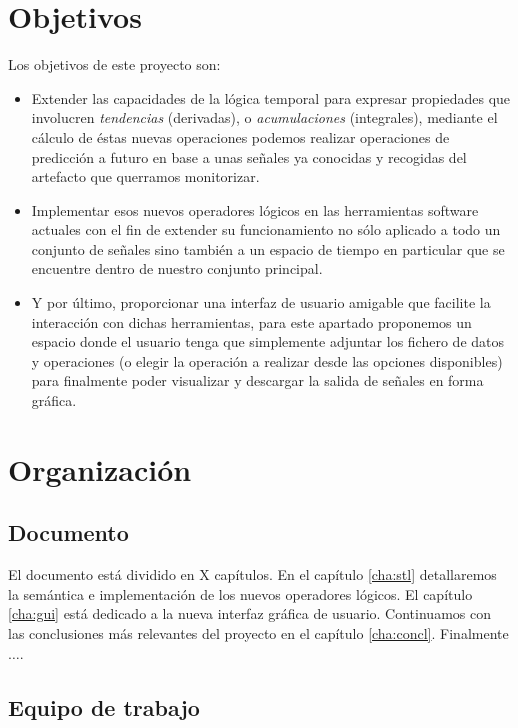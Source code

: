 \section{Objetivos}

Los objetivos de este proyecto son:

\begin{itemize}
\item Extender las capacidades de la lógica temporal para expresar propiedades que involucren \textit{tendencias} (derivadas), o \textit{acumulaciones} (integrales), mediante el cálculo de éstas nuevas operaciones podemos realizar operaciones de predicción a futuro en base a unas señales ya conocidas y recogidas del artefacto que querramos monitorizar.   
\item Implementar esos nuevos operadores lógicos en las herramientas software actuales con el fin de extender su funcionamiento no sólo aplicado a todo un conjunto de señales sino también a un espacio de tiempo en particular que se encuentre dentro de nuestro conjunto principal. 
\item Y por último, proporcionar una interfaz de usuario amigable que facilite la interacción con dichas herramientas, para este apartado  proponemos un espacio donde el usuario tenga que simplemente adjuntar los fichero de datos y operaciones (o elegir la operación a realizar desde las opciones disponibles) para finalmente poder visualizar y descargar la salida de señales en forma gráfica. 
\end{itemize}

\section{Organización}

\subsection{Documento}

El documento está dividido en X capítulos. En el capítulo \ref{cha:stl} detallaremos la semántica e implementación de los nuevos operadores lógicos. El capítulo \ref{cha:gui} está dedicado a la nueva interfaz gráfica de usuario. Continuamos con las conclusiones más relevantes del proyecto en el capítulo \ref{cha:concl}. Finalmente $\ldots$.

\subsection{Equipo de trabajo}

